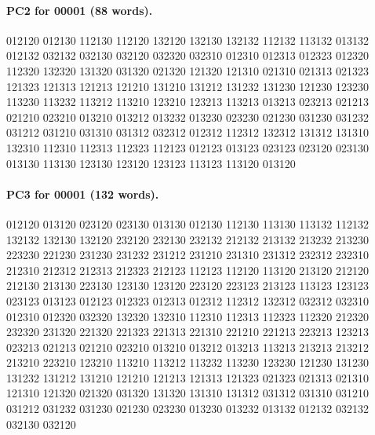 \documentclass[11pt]{article}
\theoremstyle{remark}
\numberwithin{equation}{section}
\numberwithin{table}{section}
\begin{document}
\paragraph{PC2 for 00001 (88 words).}
\begingroup\footnotesize\ttfamily\begin{flushleft}
012120 012130 112130 112120 132120 132130 132132 112132 113132 013132\\
012132 032132 032130 032120 032320 032310 012310 012313 012323 012320\\
112320 132320 131320 031320 021320 121320 121310 021310 021313 021323\\
121323 121313 121213 121210 131210 131212 131232 131230 121230 123230\\
113230 113232 113212 113210 123210 123213 113213 013213 023213 021213\\
021210 023210 013210 013212 013232 013230 023230 021230 031230 031232\\
031212 031210 031310 031312 032312 012312 112312 132312 131312 131310\\
132310 112310 112313 112323 112123 012123 013123 023123 023120 023130\\
013130 113130 123130 123120 123123 113123 113120 013120\\
\end{flushleft}\endgroup
\paragraph{PC3 for 00001 (132 words).}
\begingroup\footnotesize\ttfamily\begin{flushleft}
012120 013120 023120 023130 013130 012130 112130 113130 113132 112132\\
132132 132130 132120 232120 232130 232132 212132 213132 213232 213230\\
223230 221230 231230 231232 231212 231210 231310 231312 232312 232310\\
212310 212312 212313 212323 212123 112123 112120 113120 213120 212120\\
212130 213130 223130 123130 123120 223120 223123 213123 113123 123123\\
023123 013123 012123 012323 012313 012312 112312 132312 032312 032310\\
012310 012320 032320 132320 132310 112310 112313 112323 112320 212320\\
232320 231320 221320 221323 221313 221310 221210 221213 223213 123213\\
023213 021213 021210 023210 013210 013212 013213 113213 213213 213212\\
213210 223210 123210 113210 113212 113232 113230 123230 121230 131230\\
131232 131212 131210 121210 121213 121313 121323 021323 021313 021310\\
121310 121320 021320 031320 131320 131310 131312 031312 031310 031210\\
031212 031232 031230 021230 023230 013230 013232 013132 012132 032132\\
032130 032120\\
\end{flushleft}\endgroup
\end{document}
